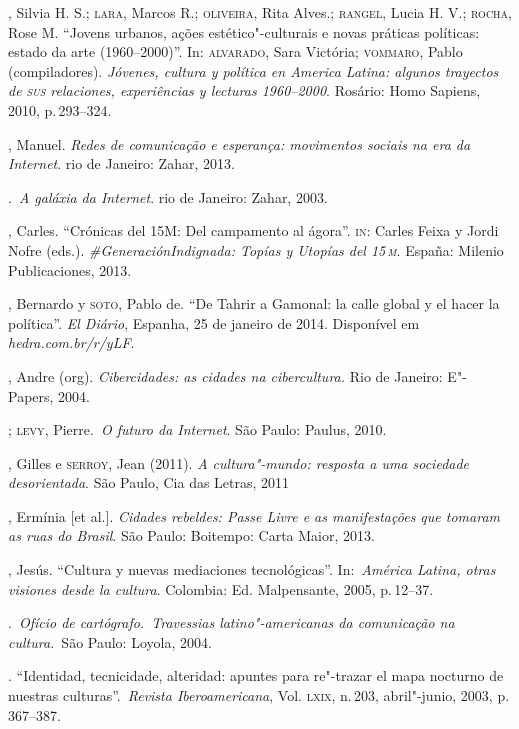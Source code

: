 \begin{bibliohedra}
, Silvia H. S.; \textsc{lara}, Marcos R.; \textsc{oliveira}, Rita Alves.; \textsc{rangel},
Lucia H. V.; \textsc{rocha}, Rose M. ``Jovens urbanos, ações estético"-culturais e
novas práticas políticas: estado da arte (1960--2000)''. In: \textsc{alvarado},
Sara Victória; \textsc{vommaro}, Pablo (compiladores). \textit{Jóvenes, cultura y
política en America Latina: algunos trayectos de \textsc{sus} relaciones,
experiências y lecturas 1960--2000}. Rosário: Homo Sapiens, 2010, p.\,293--324.

, Manuel. \textit{Redes de comunicação e esperança: movimentos
sociais na era da Internet}. rio de Janeiro: Zahar, 2013.

\titidem.~\textit{A galáxia da Internet}. rio de
Janeiro: Zahar, 2003.

, Carles. ``Crónicas del 15M: Del campamento al ágora''. \textsc{in}: Carles
Feixa y Jordi Nofre (eds.). \textit{\#GeneraciónIndignada: Topías y
Utopías del \textsc{15\,m}}. España: Milenio Publicaciones, 2013.

, Bernardo y \textsc{soto}, Pablo de. ``De Tahrir a Gamonal: la calle
global y el hacer la política''. \textit{El Diário}, Espanha, 25 de janeiro de 2014.
Disponível em \textit{hedra.com.br/r/yLF}.

, Andre (org). \textit{Cibercidades: as cidades na cibercultura.} Rio
de Janeiro: E"-Papers, 2004.

\titidem; \textsc{levy}, Pierre.~\textit{O futuro da Internet}. São Paulo:
Paulus, 2010.

, Gilles e \textsc{serroy}, Jean (2011). \textit{A cultura"-mundo:
resposta a uma sociedade desorientada}. São Paulo, Cia das Letras, 2011

, Ermínia {[}et al.{]}. \textit{Cidades rebeldes: Passe Livre e as
manifestações que tomaram as ruas do Brasil}. São Paulo: Boitempo: Carta
Maior, 2013.

, Jesús. ``Cultura y nuevas mediaciones tecnológicas''.
In:~\textit{América Latina, otras visiones desde la cultura}. Colombia:
Ed. Malpensante, 2005, p.\,12--37.

\titidem.~\textit{Ofício de
cartógrafo.~Travessias latino"-americanas da comunicação na cultura.}~São
Paulo: Loyola, 2004.

\titidem. ``Identidad, tecnicidade,
alteridad: apuntes para re"-trazar el mapa nocturno de nuestras
culturas''.~\textit{Revista Iberoamericana}, Vol. \textsc{lxix}, n.\,203,
abril"-junio, 2003, p.\,367--387.


\end{bibliohedra}
